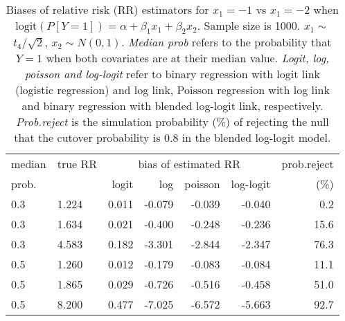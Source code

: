 \documentclass[12pt,a4paper]{article}
\begin{document}
\begin{table}[H] 
\small\sf\centering 
\caption{Biases of relative risk (RR) estimators for $x_1=-1$ vs $x_1=-2$ when $\mbox{logit}(P[Y=1])=\alpha+\beta_1 x_1 + \beta_2 x_2$. Sample size is 1000. $x_1 \sim $$t_4/\sqrt{2}$, $x_2 \sim N(0,1)$. {\it Median prob} refers to the probability that $Y=1$ when both covariates are at their median value. {\it Logit, log, poisson and log-logit} refer to binary regression with logit link (logistic regression) and log link, Poisson regression with log link and binary regression with blended log-logit link, respectively. {\it Prob.reject} is the simulation probability (\%) of rejecting the null that the cutover probability is $0.8$ in the blended log-logit model.} 
\begin{tabular}{llrrrrr} 
\toprule 
median & true RR & \multicolumn{4}{c}{bias of estimated RR} & prob.reject \\ 
prob. & & logit & log & poisson & log-logit  & (\%) \\ \midrule 
0.3 & 1.224 & 0.011 & -0.079 & -0.039 & -0.040 &  0.2 \\  
0.3 & 1.634 & 0.021 & -0.400 & -0.248 & -0.236 & 15.6 \\  
0.3 & 4.583 & 0.182 & -3.301 & -2.844 & -2.347 & 76.3 \\  
0.5 & 1.260 & 0.012 & -0.179 & -0.083 & -0.084 & 11.1 \\  
0.5 & 1.865 & 0.029 & -0.726 & -0.516 & -0.458 & 51.0 \\  
0.5 & 8.200 & 0.477 & -7.025 & -6.572 & -5.663 & 92.7 \\  
\bottomrule 
\end{tabular} 
\end{table} 
\end{document}
